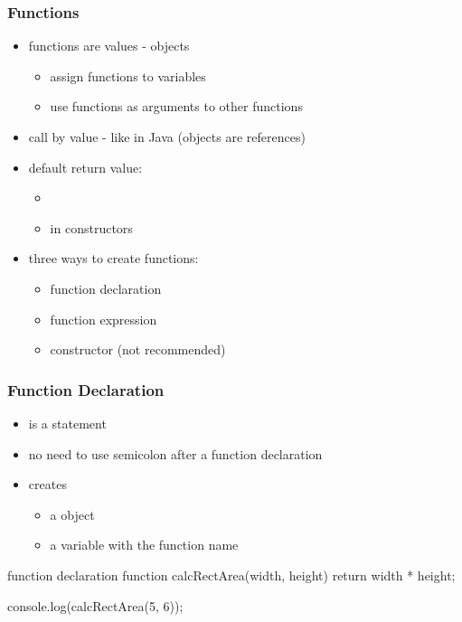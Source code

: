\begin{frame}[fragile] \frametitle{Functions}

\begin{itemize}
  \item functions are values -  objects
  \begin{itemize}
    \item assign functions to variables
    \item use functions as arguments to other functions
  \end{itemize}
  \item call by value - like in Java (objects are references)
  \item default return value:
  \begin{itemize}
    \item {}
    \item {} in constructors
  \end{itemize}
  \item three ways to create functions:
  \begin{itemize}
    \item function declaration
    \item function expression
    \item {} constructor (not recommended)
  \end{itemize}
\end{itemize}

\end{frame}

\begin{frame}[fragile] \frametitle{Function Declaration}

\begin{itemize}
  \item is a statement
  \item no need to use semicolon after a function declaration
  \item creates
  \begin{itemize}
    \item a  object
    \item a variable with the function name
  \end{itemize}
\end{itemize}
\begin{CodeBox}{function declaration}
function calcRectArea(width, height) {
  return width * height;
}

console.log(calcRectArea(5, 6));
\end{CodeBox}
\end{frame}

